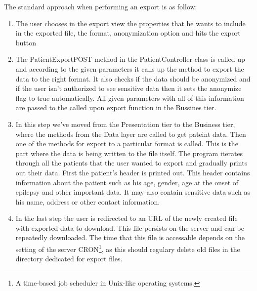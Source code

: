 \documentclass[thesis=B,english]{FITthesis}[2012/10/20]
\begin{document}
The standard approach when performing an export is as follow:
\begin{enumerate}
\item{ The user chooses in the export view the properties that he wants to include in the exported file, the format, anonymization option and hits the export button }
\item{ The PatientExportPOST method in the PatientController class is called up and according to the given parameters it calls up the method to export the data to the right format. It also checks if the data should be anonymized and if the user isn't authorized to see sensitive data then it sets the anonymize flag to true automatically. All given parameters with all of this information are passed to the called upon export function in the Bussines tier.}
\item{ In this step we've moved from the Presentation tier to the Business tier, where the methods from the Data layer are called to get pateint data. Then one of the methods for export to a particular format is called. This is the part where the data is being written to the file itself. The program iterates through all the patients that the user wanted to export and gradually prints out their data.}
First the patient's header is printed out. This header contains information about the patient such as his age, gender, age at the onset of epilepsy and other important data. It may also contain sensitive data such as his name, address or other contact information.
\item{ In the last step the user is redirected to an URL of the newly created file with exported data to download. This file persists on the server and can be repeatedly downloaded. The time that this file is accessable depends on the setting of the server CRON\footnote{A time-based job scheduler in Unix-like operating systems.}, as this should regulary delete old files in the directory dedicated for export files.}

\end{enumerate}
\end{document}
